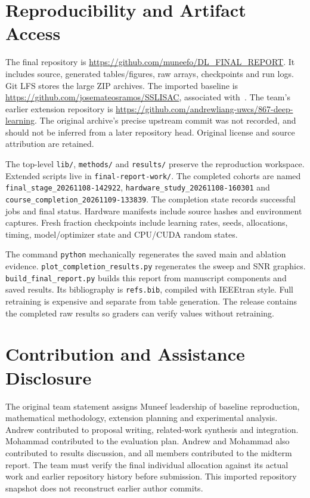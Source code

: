 \documentclass[conference]{IEEEtran}
\begin{document}
\section{Reproducibility and Artifact Access}
The final repository is \url{https://github.com/muneefo/DL_FINAL_REPORT}. It includes source, generated tables/figures, raw arrays, checkpoints and run logs. Git LFS stores the large ZIP archives. The imported baseline is \url{https://github.com/josemateosramos/SSLISAC}, associated with~\cite{ssl}. The team's earlier extension repository is \url{https://github.com/andrewliang-uwcs/867-deep-learning}. The original archive's precise upstream commit was not recorded, and should not be inferred from a later repository head. Original license and source attribution are retained.

The top-level \texttt{lib/}, \texttt{methods/} and \texttt{results/} preserve the reproduction workspace. Extended scripts live in \texttt{final-report-work/}. The completed cohorts are named \texttt{final\_stage\_20261108-142922}, \texttt{hardware\_study\_20261108-160301} and \texttt{course\_completion\_20261109-133839}. The completion state records successful jobs and final status. Hardware manifests include source hashes and environment captures. Fresh fraction checkpoints include learning rates, seeds, allocations, timing, model/optimizer state and CPU/CUDA random states.

The command \texttt{python}  mechanically regenerates the saved main and ablation evidence. \texttt{plot\_completion\_results.py} regenerates the sweep and SNR graphics. \texttt{build\_final\_report.py} builds this report from manuscript components and saved results. Its bibliography is \texttt{refs.bib}, compiled with IEEEtran style. Full retraining is expensive and separate from table generation. The release contains the completed raw results so graders can verify values without retraining.

\section{Contribution and Assistance Disclosure}
The original team statement assigns Muneef leadership of baseline reproduction, mathematical methodology, extension planning and experimental analysis. Andrew contributed to proposal writing, related-work synthesis and integration. Mohammad contributed to the evaluation plan. Andrew and Mohammad also contributed to results discussion, and all members contributed to the midterm report. The team must verify the final individual allocation against its actual work and earlier repository history before submission. This imported repository snapshot does not reconstruct earlier author commits.
\end{document}
